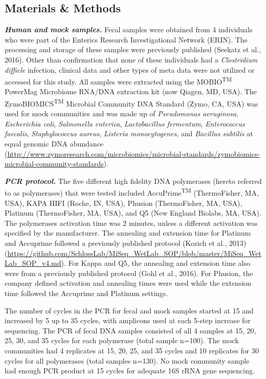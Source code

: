 \documentclass[11pt,]{article}
\begin{document}
\newpage

\subsection{Materials \& Methods}\label{materials-methods}

\textbf{\emph{Human and mock samples.}} Fecal samples were obtained from
4 individuals who were part of the Enterics Research Investigational
Network (ERIN). The processing and storage of these samples were
previously published (Seekatz et al., 2016). Other than confirmation
that none of these individuals had a \emph{Clostridium difficle}
infection, clinical data and other types of meta data were not utilized
or accessed for this study. All samples were extracted using the
MOBIO\textsuperscript{TM} PowerMag Microbiome RNA/DNA extraction kit
(now Qiagen, MD, USA). The ZymoBIOMICS\textsuperscript{TM} Microbial
Community DNA Standard (Zymo, CA, USA) was used for mock communities and
was made up of \emph{Pseudomonas aeruginosa}, \emph{Escherichia coli},
\emph{Salmonella enterica}, \emph{Lactobacillus fermentum},
\emph{Enterococcus faecalis}, \emph{Staphylococcus aureus},
\emph{Listeria monocytogenes}, and \emph{Bacillus subtilis} at equal
genomic DNA abundance
(\url{http://www.zymoresearch.com/microbiomics/microbial-standards/zymobiomics-microbial-community-standards}).

\textbf{\emph{PCR protocol.}} The five different high fidelity DNA
polymerases (hereto referred to as polymerases) that were tested
included AccuPrime\textsuperscript{TM} (ThermoFisher, MA, USA), KAPA
HIFI (Roche, IN, USA), Phusion (ThermoFisher, MA, USA), Platinum
(ThermoFisher, MA, USA), and Q5 (New England Biolabs, MA, USA). The
polymerases activation time was 2 minutes, unless a different activation
was specified by the manufacturer. The annealing and extension time for
Platinum and Accuprime followed a previously published protocol (Kozich
et al., 2013)
(\url{https://github.com/SchlossLab/MiSeq_WetLab_SOP/blob/master/MiSeq_WetLab_SOP_v4.md}).
For Kappa and Q5, the annealing and extension time also were from a
previously published protocol (Gohl et al., 2016). For Phusion, the
company defined activation and annealing times were used while the
extension time followed the Accuprime and Platinum settings.

The number of cycles in the PCR for fecal and mock samples started at 15
and increased by 5 up to 35 cycles, with amplicons used at each 5-step
increase for sequencing. The PCR of fecal DNA samples consisted of all 4
samples at 15, 20, 25, 30, and 35 cycles for each polymerase (total
sample n=100). The mock communities had 4 replicates at 15, 20, 25, and
35 cycles and 10 replicates for 30 cycles for all polymerases (total
samples n=130). No mock community sample had enough PCR product at 15
cycles for adequate 16S rRNA gene sequencing.
\end{document}
